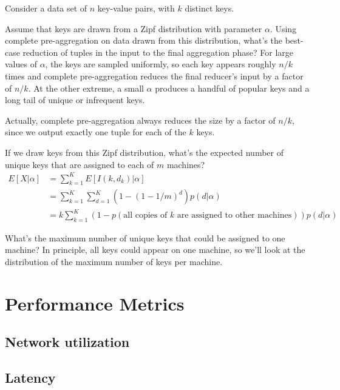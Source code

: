 \documentclass[12pt]{article}
\begin{document}
Consider a data set of $n$ key-value pairs, with $k$ distinct keys.

Assume that keys are drawn from a Zipf distribution with parameter $\alpha$.
Using complete pre-aggregation on data drawn from this distribution, what's the best-case reduction of tuples in the input to the final aggregation phase?
For large values of $\alpha$, the keys are sampled uniformly, so each key appears roughly $n/k$ times and complete pre-aggregation reduces the final reducer's input by a factor of $n/k$.
At the other extreme, a small $\alpha$ produces a handful of popular keys and a long tail of unique or infrequent keys.

Actually, complete pre-aggregation always reduces the size by a factor of $n/k$, since we output exactly one tuple for each of the $k$ keys.


If we draw keys from this Zipf distribution, what's the expected number of unique keys that are assigned to each of $m$ machines?
\begin{align*}
    E[X|\alpha] &= \sum_{k=1}^K E[I(k, d_k) | \alpha]
\\              &= \sum_{k=1}^K \sum_{d=1}^K \left(1 - \left(1 - 1/m\right)^d\right)p(d | \alpha)
\\              &= k \sum_{k=1}^K\left(1 - p\left(\text{all copies of $k$ are assigned to other machines}\right)\right) p(d | \alpha)
\end{align*}

What's the maximum number of unique keys that could be assigned to one machine?  In principle, all keys could appear on one machine, so we'll look at the distribution of the maximum number of keys per machine.

\section{Performance Metrics}

\subsection{Network utilization}

\subsection{Latency}
\end{document}

